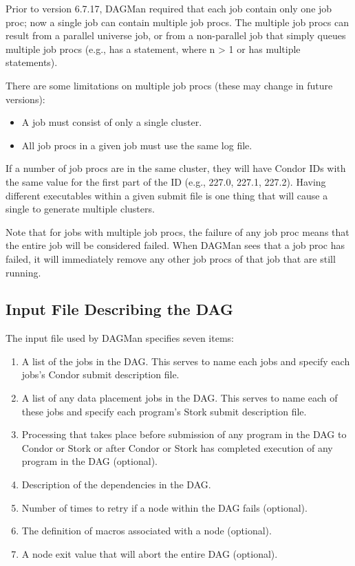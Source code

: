 Prior to version 6.7.17, DAGMan required that each job contain only
one job proc; now a single job can contain multiple job procs.
The multiple job procs can result from a parallel universe job,
or from a non-parallel job that simply queues multiple job procs
(e.g., has a  statement, where n > 1 or has multiple
 statements).

There are some limitations on multiple job procs (these may change
in future versions):
\begin{itemize}
\item A job must consist of only a single cluster.
\item All job procs in a given job must use the same log file.
\end{itemize}

If a number of job procs are in the same cluster, they will have Condor
IDs with the same value for the first part of the ID (e.g., 227.0, 227.1,
227.2).  Having different executables within a given submit file is
one thing that will cause a single  to generate multiple
clusters.

Note that for jobs with multiple job procs, the failure of any job
proc means that the entire job will be considered failed.  When DAGMan
sees that a job proc has failed, it will immediately remove any
other job procs of that job that are still running.

\subsection{Input File Describing the DAG}

The input file used by DAGMan specifies seven items:
\begin{enumerate}
\item
A list of the jobs in the DAG. This serves to name each jobs
and specify each jobs's Condor submit description file.
\item
A list of any data placement jobs in the DAG.
This serves to name each of these jobs and
specify each program's Stork submit description file.
\item
Processing that takes place before submission of
any program in the DAG to Condor or Stork or after Condor or Stork
has completed execution
of any program in the DAG (optional).
\item
Description of the dependencies in the DAG.
\item
Number of times to retry if a node within the DAG fails (optional).
\item
The definition of macros associated with a node (optional).
\item
A node exit value that will abort the entire DAG (optional).
\end{enumerate}

